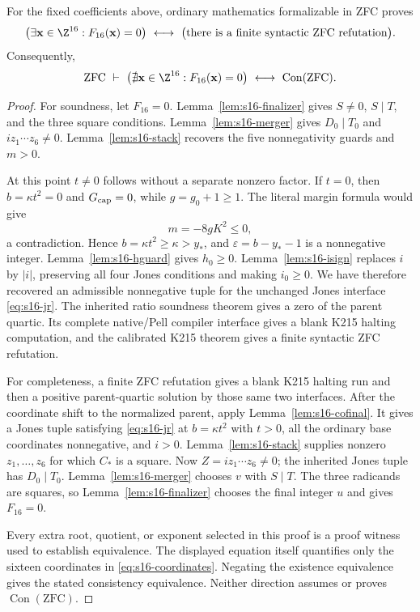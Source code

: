 \begin{theorem}\label{thm:s16}
For the fixed coefficients above, ordinary mathematics formalizable
in ZFC proves
\[
 \big(\exists {\bf x}\in\Z^{16}:F_{16}({\bf x})=0\big)
 \ \longleftrightarrow\
 \big(\text{there is a finite syntactic ZFC refutation}\big).
\]
Consequently,
\[
 \mathrm{ZFC}\ \vdash\
 \big(\nexists{\bf x}\in\Z^{16}:F_{16}({\bf x})=0\big)
 \ \longleftrightarrow\ \operatorname{Con}(\mathrm{ZFC}).
\]
\end{theorem}
\begin{proof}
For soundness, let \(F_{16}=0\).
Lemma~\ref{lem:s16-finalizer} gives \(S\neq0\), \(S\mid T\), and
the three square conditions.
Lemma~\ref{lem:s16-merger} gives \(D_0\mid T_0\) and
\(i z_1\cdots z_6\neq0\).
Lemma~\ref{lem:s16-stack} recovers the five nonnegativity guards
and \(m>0\).

At this point \(t\neq0\) follows without a separate nonzero factor.
If \(t=0\), then \(b=\kappa t^2=0\) and \(G_{\rm cap}=0\), while
\(g=g_0+1\geq1\).  The literal margin formula would give
\[
 m=-8gK^2\leq0,
\]
a contradiction.
Hence \(b=\kappa t^2\geq\kappa>y_*\), and
\(\varepsilon=b-y_*-1\) is a nonnegative integer.
Lemma~\ref{lem:s16-hguard} gives \(h_0\geq0\).
Lemma~\ref{lem:s16-isign} replaces \(i\) by \(|i|\), preserving all
four Jones conditions and making \(i_0\geq0\).
We have therefore recovered an admissible nonnegative tuple for the
unchanged Jones interface \eqref{eq:s16-jr}.
The inherited ratio soundness theorem gives a zero of the parent
quartic.  Its complete native/Pell compiler interface gives a blank
K215 halting computation, and the calibrated K215 theorem gives a
finite syntactic ZFC refutation.

For completeness, a finite ZFC refutation gives a blank K215 halting
run and then a positive parent-quartic solution by those same two
interfaces.
After the coordinate shift to the normalized parent, apply
Lemma~\ref{lem:s16-cofinal}.
It gives a Jones tuple satisfying \eqref{eq:s16-jr} at
\(b=\kappa t^2\) with \(t>0\), all the ordinary base coordinates
nonnegative, and \(i>0\).
Lemma~\ref{lem:s16-stack} supplies nonzero \(z_1,\ldots,z_6\)
for which \(C_*\) is a square.
Now \(Z=i z_1\cdots z_6\neq0\); the inherited Jones tuple has
\(D_0\mid T_0\).
Lemma~\ref{lem:s16-merger} chooses \(v\) with \(S\mid T\).
The three radicands are squares, so
Lemma~\ref{lem:s16-finalizer} chooses the final integer \(u\)
and gives \(F_{16}=0\).

Every extra root, quotient, or exponent selected in this proof is a
proof witness used to establish equivalence.  The displayed equation
itself quantifies only the sixteen coordinates in
\eqref{eq:s16-coordinates}.
Negating the existence equivalence gives the stated consistency
equivalence.  Neither direction assumes or proves
\(\operatorname{Con}(\mathrm{ZFC})\).
\end{proof}

